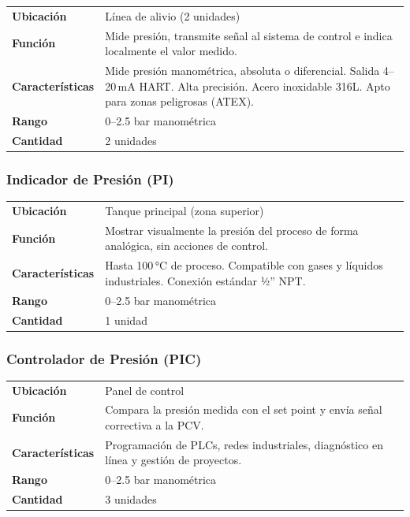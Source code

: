 \documentclass[12pt,letterpaper]{article}
\begin{document}
\begin{especbox}[title={PIT — Siemens SITRANS P DS III}]
\renewcommand{\arraystretch}{1.25}
\begin{tabular}{L{4cm} L{9.5cm}}
\textbf{Ubicación}     & Línea de alivio (2 unidades) \\
\textbf{Función}       & Mide presión, transmite señal al sistema de control e indica localmente el valor medido. \\
\textbf{Características} & Mide presión manométrica, absoluta o diferencial. Salida 4--20\,mA HART. Alta precisión. Acero inoxidable 316L. Apto para zonas peligrosas (ATEX). \\
\textbf{Rango}         & 0--2.5 bar manométrica \\
\textbf{Cantidad}      & 2 unidades \\
\end{tabular}
\end{especbox}

\subsubsection{Indicador de Presión (PI)}

\begin{especbox}[title={PI — Manómetro WIKA 232.50}]
\renewcommand{\arraystretch}{1.25}
\begin{tabular}{L{4cm} L{9.5cm}}
\textbf{Ubicación}       & Tanque principal (zona superior) \\
\textbf{Función}         & Mostrar visualmente la presión del proceso de forma analógica, sin acciones de control. \\
\textbf{Características} & Hasta 100\,°C de proceso. Compatible con gases y líquidos industriales. Conexión estándar ½'' NPT. \\
\textbf{Rango}           & 0--2.5 bar manométrica \\
\textbf{Cantidad}        & 1 unidad \\
\end{tabular}
\end{especbox}

\subsubsection{Controlador de Presión (PIC)}

\begin{especbox}[title={PIC — Siemens TIA Portal}]
\renewcommand{\arraystretch}{1.25}
\begin{tabular}{L{4cm} L{9.5cm}}
\textbf{Ubicación}       & Panel de control \\
\textbf{Función}         & Compara la presión medida con el set point y envía señal correctiva a la PCV. \\
\textbf{Características} & Programación de PLCs, redes industriales, diagnóstico en línea y gestión de proyectos. \\
\textbf{Rango}           & 0--2.5 bar manométrica \\
\textbf{Cantidad}        & 3 unidades \\
\end{tabular}
\end{especbox}
\end{document}
